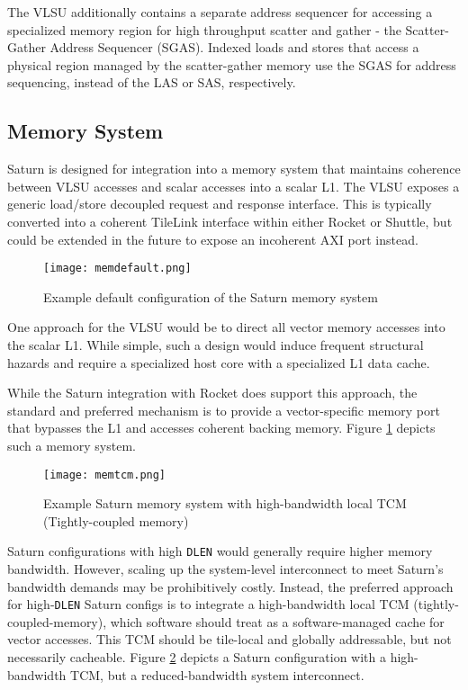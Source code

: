 The VLSU additionally contains a separate address sequencer for accessing a specialized memory region for high throughput scatter and gather - the Scatter-Gather Address Sequencer (SGAS).
Indexed loads and stores that access a physical region managed by the scatter-gather memory use the SGAS for address sequencing, instead of the LAS or SAS, respectively.

\subsection{Memory System}

Saturn is designed for integration into a memory system that maintains coherence between VLSU accesses and scalar accesses into a scalar L1.
The VLSU exposes a generic load/store decoupled request and response interface.
This is typically converted into a coherent TileLink interface within either Rocket or Shuttle, but could be extended in the future to expose an incoherent AXI port instead.

\begin{figure}[h]
  \centering
  \texttt{[image: memdefault.png]}
  \caption{Example default configuration of the Saturn memory system}
  \label{fig:mem-default}
\end{figure}

One approach for the VLSU would be to direct all vector memory accesses into the scalar L1.
While simple, such a design would induce frequent structural hazards and require a specialized host core with a specialized L1 data cache.

While the Saturn integration with Rocket does support this approach, the standard and preferred mechanism is to provide a vector-specific memory port that bypasses the L1 and accesses coherent backing memory.
Figure \ref{fig:mem-default} depicts such a memory system.


\begin{figure}[h]
  \centering
  \texttt{[image: memtcm.png]}
  \caption{Example Saturn memory system with high-bandwidth local TCM (Tightly-coupled memory)}
  \label{fig:mem-tcm}
\end{figure}

Saturn configurations with high \texttt{DLEN} would generally require higher memory bandwidth.
However, scaling up the system-level interconnect to meet Saturn's bandwidth demands may be prohibitively costly.
Instead, the preferred approach for high-\texttt{DLEN} Saturn configs is to integrate a high-bandwidth local TCM (tightly-coupled-memory), which software should treat as a software-managed cache for vector accesses.
This TCM should be tile-local and globally addressable, but not necessarily cacheable.
Figure \ref{fig:mem-tcm} depicts a Saturn configuration with a high-bandwidth TCM, but a reduced-bandwidth system interconnect.

